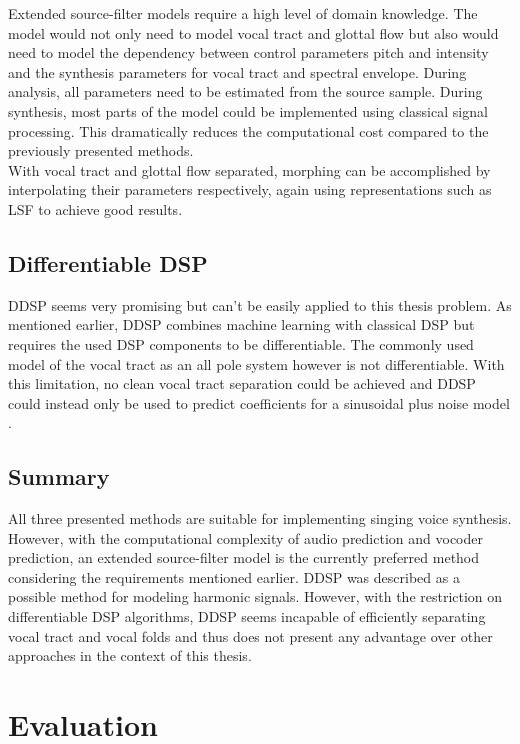Extended source-filter models require a high level of domain knowledge. The model would not only need to model vocal tract and glottal flow but also would need to model the dependency between control parameters pitch and intensity and the synthesis parameters for vocal tract and spectral envelope. During analysis, all parameters need to be estimated from the source sample. During synthesis, most parts of the model could be implemented using classical signal processing. This dramatically reduces the computational cost compared to the previously presented methods.\\
With vocal tract and glottal flow separated, morphing can be accomplished by interpolating their parameters respectively, again using representations such as LSF to achieve good results.

\subsection{Differentiable DSP}

DDSP \cite{engel_ddsp:_2020} seems very promising but can't be easily applied to this thesis problem. As mentioned earlier, DDSP combines machine learning with classical DSP but requires the used DSP components to be differentiable. The commonly used model of the vocal tract as an all pole system however is not differentiable. With this limitation, no clean vocal tract separation could be achieved and DDSP could instead only be used to predict coefficients for a sinusoidal plus noise model \cite{serra_musical_1997}.

\subsection{Summary}

All three presented methods are suitable for implementing singing voice synthesis. However, with the computational complexity of audio prediction and vocoder prediction, an extended source-filter model is the currently preferred method considering the requirements mentioned earlier. DDSP was described as a possible method for modeling harmonic signals. However, with the restriction on differentiable DSP algorithms, DDSP seems incapable of efficiently separating vocal tract and vocal folds and thus does not present any advantage over other approaches in the context of this thesis.

\section{Evaluation}

